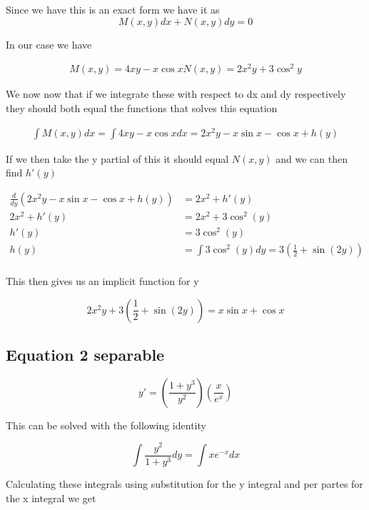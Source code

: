 \documentclass[a4paper]{article}
\begin{document}
Since we have this is an exact form we have it as 
\begin{equation}
    M(x,y)dx + N(x,y)dy = 0
\end{equation}

In our case we have 

\begin{align}
    M(x,y) = 4xy - x\cos{x}
    N(x,y) = 2x^2y + 3\cos^2{y}
\end{align}

We now now that if we integrate these with respect to dx and dy respectively they should both equal the functions that solves this equation

\begin{align}
    \int M(x,y) dx = \int 4xy - x\cos{x} dx = 2x^2y - x\sin{x} - \cos{x} + h(y)
\end{align}

If we then take the y partial of this it should equal $N(x,y)$ and we can then find $h'(y)$

\begin{align}
    \frac{d}{dy}(2x^2y - x\sin{x} - \cos{x} + h(y)) &= 2x^2 + h'(y) \\
    2x^2 + h'(y) &= 2x^2 + 3\cos^2(y) \\
    h'(y) &= 3\cos^2(y) \\
    h(y) &= \int 3\cos^2(y) dy = 3(\frac{1}{2} + \sin(2y)) \\
\end{align}

This then gives us an implicit function for y

\begin{equation}
    2x^2y + 3(\frac{1}{2} + \sin(2y)) = x\sin{x} + \cos{x}
\end{equation}

\subsection{Equation 2 separable}

\begin{equation}
    y' = (\frac{1+y^3}{y^2})(\frac{x}{e^x})
\end{equation}

This can be solved with the following identity

\begin{equation}
    \int \frac{y^2}{1 + y^3} dy = \int x e^{-x} dx
\end{equation}

Calculating these integrals using substitution for the y integral and per partes for the x integral we get
\end{document}
